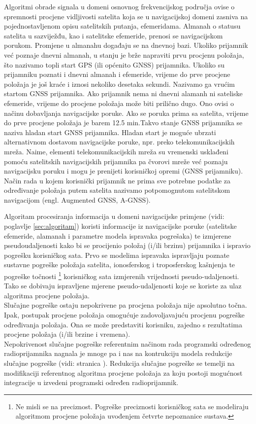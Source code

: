\documentclass[a4paper,twoside,12pt]{memoir} %
\begin{document}
Algoritmi obrade signala u domeni osnovnog frekvencijskog područja ovise o spremnosti procjene vidljivosti satelita koja se u navigacijskoj domeni zasniva na pojednostavljenom
opisu satelitskih putanja, efemeridama. Almanah o statusu satelita u sazviježđu, kao i satelitske efemeride, prenosi se navigacijskom porukom. Promjene u almanahu događaju se na
dnevnoj bazi. Ukoliko prijamnik već poznaje dnevni almanah, u stanju je brže napraviti
prvu procjenu položaja, što nazivamo topli start GPS (ili općenito GNSS) prijamnika.
Ukoliko su prijamniku poznati i dnevni almanah i efemeride, vrijeme do prve procjene položaja je još kraće i iznosi nekoliko desetaka sekundi. Nazivamo ga vrućim startom GNSS prijamnika. Ako
prijamnik nema ni dnevni alamanh ni sateliske efemeride, vrijeme do procjene položaja
može biti prilično dugo. Ono ovisi o načinu dobavljanja navigacijske poruke. Ako se poruka
prima sa satelita, vrijeme do prve procjene položaja je barem 12.5 min.Takvo stanje GNSS prijamnika se naziva hladan start GNSS prijamnika. Hladan start je moguće ubrzati alternativnom dostavom navigacijske poruke, npr. preko
telekomunikacijskih mreža. Naime, elementi telekomunikacijskih mreža su vremenski usklađeni pomoću satelitskih
navigacijskih prijamnika pa čvorovi mreže već poznaju navigacijsku poruku i mogu je prenijeti
korisničkoj opremi (GNSS prijamniku). Način rada u kojem
korisnički prijamnik ne prima sve potrebne podatke za određivanje položaja putem satelita nazivamo potpomognutom satelitskom navigacijom (engl. Augmented GNSS, A-GNSS).

Algoritam procesiranja informacija u domeni navigacijske primjene (vidi: poglavlje \ref{sec:algoritam}) koristi informacije iz
navigacijske poruke (satelitske efemeride, alamanah i parametre modela ispravaka pogrešaka) te
izmjerene pseudoudaljenosti kako bi se procijenio položaj (i/ili brzinu) prijamnika i ispravio
pogrešku korisničkog sata. Prvo se modelima ispravaka ispravljaju poznate sustavne pogreške
položaja satelita, ionosferskog i troposferskog kašnjenja te pogreške točnosti \footnote{Ne misli se na preciznost. Pogreške preciznosti korisničkog sata se modeliraju algoritmom procjene položaja uvođenjem četvrte nepoznanice sustava.} korisničkog sata izmjerenih vrijednosti pseudo-udaljenosti. Tako se dobivaju ispravljene mjerene pseudo-udaljenosti  koje se koriste za ulaz algoritma procjene položaja. \\
Slučajne pogreške ostaju nepokrivene pa procjena položaja nije
apsolutno točna. Ipak, postupak procjene položaja omogućuje zadovoljavajuću procjenu pogreške
određivanja položaja. Ona se može predstaviti korisniku, zajedno s rezultatima procjene položaja (i/ili brzine i vremena).\\
Nepokrivenost slučajne pogreške referentnim načinom rada programski određenog radioprijamnika nagnala je mnoge pa i nas na kontrukciju modela redukcije slučajne pogreške (vidi: stranica \pageref{sec:algTezine}). 
Redukcija slučajne pogreške se temelji na modifikaciji referentnog algoritma procjene položaja
za koju postoji mogućnost integracije u izvedeni programski određen radioprijamnik.
\end{document}
